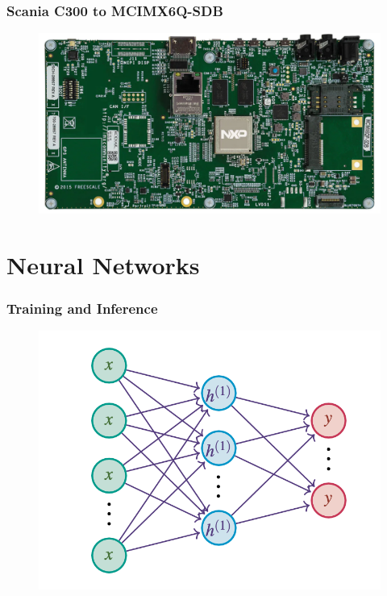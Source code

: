 \documentclass{beamer}
\begin{document}
\begin{frame}
  \frametitle{Scania C300 to MCIMX6Q-SDB}

  \begin{figure}
    \centering
    \includegraphics[scale=0.21]{../Body/images/MCIMX6Q-SDB-BD.png}
  \end{figure}

\end{frame}

\section{Neural Networks}

\begin{frame}
  \frametitle{Training and Inference}

  \begin{figure}
    \centering
    \includegraphics[scale=0.42]{images/network.png}
  \end{figure}

\end{frame}
\end{document}
